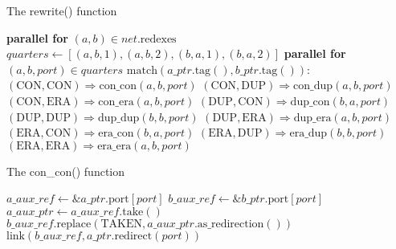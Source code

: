 \documentclass{article}
\begin{document}
\begin{algorithm}
\caption{The rewrite() function}\label{alg:rewrite}
\begin{algorithmic}[1]
    \State \textbf{parallel for} $(a, b) \in net.\text{redexes}$
        \State $quarters \gets [(a, b, 1), (a, b, 2), (b, a, 1), (b, a, 2)]$
        \State \textbf{parallel for} $(a, b, port) \in quarters$
            \State $\text{match}(a\_ptr.\text{tag}(), b\_ptr.\text{tag}()):$
                \State \hspace{1cm}$(\text{CON}, \text{CON}) \Rightarrow \text{con\_con}(a, b, port)$
                \State \hspace{1cm}$(\text{CON}, \text{DUP}) \Rightarrow \text{con\_dup}(a, b, port)$
                \State \hspace{1cm}$(\text{CON}, \text{ERA}) \Rightarrow \text{con\_era}(a, b, port)$
                \State \hspace{1cm}$(\text{DUP}, \text{CON}) \Rightarrow \text{dup\_con}(b, a, port)$
                \State \hspace{1cm}$(\text{DUP}, \text{DUP}) \Rightarrow \text{dup\_dup}(b, b, port)$
                \State \hspace{1cm}$(\text{DUP}, \text{ERA}) \Rightarrow \text{dup\_era}(a, b, port)$
                \State \hspace{1cm}$(\text{ERA}, \text{CON}) \Rightarrow \text{era\_con}(b, a, port)$
                \State \hspace{1cm}$(\text{ERA}, \text{DUP}) \Rightarrow \text{era\_dup}(b, b, port)$
                \State \hspace{1cm}$(\text{ERA}, \text{ERA}) \Rightarrow \text{era\_era}(a, b, port)$
\EndProcedure
\end{algorithmic}
\end{algorithm}

\begin{algorithm}
\caption{The con\_con() function}\label{alg:con_con}
\begin{algorithmic}[1]
    \State $a\_aux\_ref \gets \&a\_ptr.\text{port}[port]$
    \State $b\_aux\_ref \gets \&b\_ptr.\text{port}[port]$
    \State $a\_aux\_ptr \gets a\_aux\_ref.\text{take}()$
    \State $b\_aux\_ref.\text{replace}(\text{TAKEN}, a\_aux\_ptr.\text{as\_redirection}())$
        \State $\text{link}(b\_aux\_ref, a\_ptr.\text{redirect}(port))$
    \EndIf
\EndProcedure
\end{algorithmic}
\end{algorithm}
\end{document}
